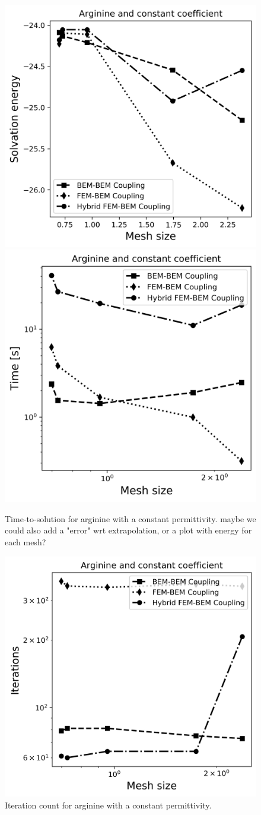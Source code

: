 \begin{figure}
\centering
   \includegraphics[width=0.45\linewidth]{Arginine_const_coeff_error.png}
  \includegraphics[width=0.6\linewidth]{Arginine_const_coeff_time.png}
\caption{Time-to-solution for arginine with a constant permittivity. %
maybe we could also add a "error" wrt extrapolation, or a plot with energy for each mesh?}
\label{fig:arg_contant_time}
\end{figure}


\begin{figure}
\centering
  \includegraphics[width=0.6\linewidth]{Arginine_const_coeff_iter.png}
\caption{Iteration count for arginine with a constant permittivity. %
}
\label{fig:arg_contant_iter}
\end{figure}


